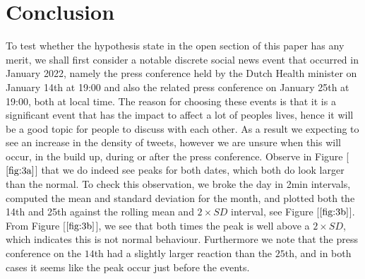 \documentclass[9pt]{article}
\begin{document}
\section{Conclusion}

To test whether the hypothesis state in the open section of this paper has any merit, we
shall first consider a notable discrete social news event that occurred in January 2022,
namely the press conference held by the Dutch Health minister on January 14th at 19:00 and
also the related press conference on January 25th at 19:00, both at local time. The reason
for choosing these events is that it is a significant event that has the
impact to affect a lot of peoples lives, hence it will be a good topic for people to
discuss with each other. As a result we expecting to see an increase in the density of tweets,
however we are unsure when this will occur, in the build up, during or after the press
conference. Observe in Figure [$\ref{fig:3a}$] that we do indeed see peaks for both dates,
which both do look larger than the normal. To check this observation, we broke the day in
2min intervals, computed the mean and standard deviation for the month, and plotted both
the 14th and 25th against the rolling mean and $2\times SD$ interval, see Figure
[$\ref{fig:3b}$]. From Figure [$\ref{fig:3b}$], we see that both times the peak is well
above a $2\times SD$, which indicates this is not normal behaviour. Furthermore we note
that the press conference on the $14$th had a slightly larger reaction than the $25$th,
and in both cases it seems like the peak occur just before the events.  
\end{document}
